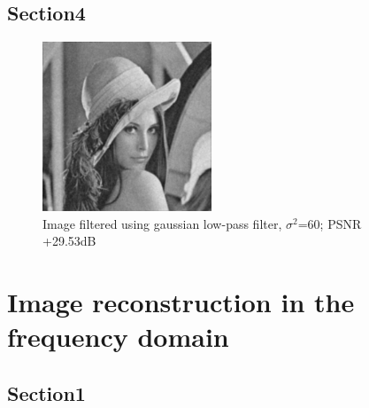 \documentclass[article, 1.5space, letterpaper, 12pt, oneside, header, footer]{SydeClass}
\begin{document}
\subsection{Section4}
\begin{figure}[ht]
\centering
	\includegraphics[width=0.45\textwidth]{question5/4_lena_LFP_gauss60}
	\caption{Image filtered using gaussian low-pass filter, $\sigma^2$=60; PSNR +29.53dB}
\end{figure}

\section{Image reconstruction in the frequency domain}

\subsection{Section1}
\begin{figure}[ht]
\centering
\end{figure}
\end{document}

